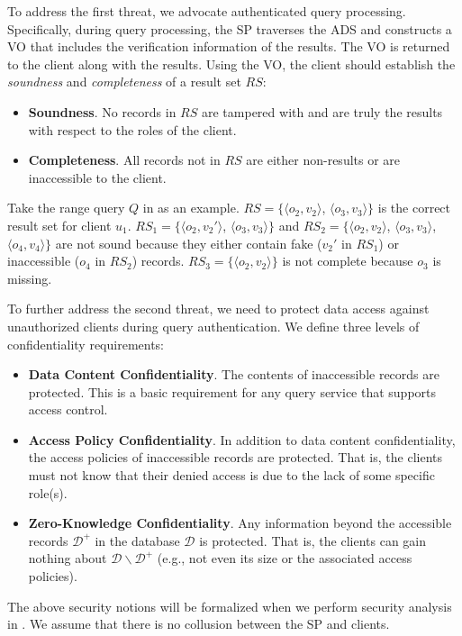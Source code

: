 To address the first threat, we advocate authenticated query processing. Specifically, during query processing, the SP traverses the ADS and constructs a VO that includes the verification information of the results. The VO is returned to the client along with the results. Using the VO, the client should establish the \emph{soundness} and \emph{completeness} of a result set $RS$:
\begin{itemize}
  \item \textbf{Soundness}. No records in $RS$ are tampered with and are truly the results with respect to the roles of the client.
  \item \textbf{Completeness}. All records not in $RS$ are either non-results or are inaccessible to the client.
\end{itemize}
Take the range query $Q$ in  as an example. $RS=\{\langle o_2, v_2\rangle$, $\langle o_3, v_3\rangle\}$ is the correct result set for client $u_1$. $RS_1 = \{\langle o_2, v_2'\rangle$, $\langle o_3, v_3\rangle\}$ and $RS_2 = \{\langle o_2, v_2\rangle$, $\langle o_3, v_3\rangle$, $\langle o_4, v_4\rangle\}$ are not sound because they either contain fake ($v_2'$ in $RS_1$) or inaccessible ($o_4$ in $RS_2$) records.  $RS_3 = \{\langle o_2, v_2\rangle\}$ is not complete because $o_3$ is missing.

To further address the second threat, we need to protect data access against unauthorized clients during query authentication. We define three levels of confidentiality requirements:
\begin{itemize}
  \item \textbf{Data Content Confidentiality}. The contents of inaccessible records are protected. This is a basic requirement for any query service that supports access control.
  \item \textbf{Access Policy Confidentiality}. In addition to data content confidentiality, the access policies of inaccessible records are protected. That is, the clients must not know that their denied access is due to the lack of some specific role(s). %
  \item \textbf{Zero-Knowledge Confidentiality}.
    Any information beyond the accessible records $\mathcal{D}^+$ in the database $\mathcal{D}$ is protected. That is, the clients can gain nothing about $\mathcal{D}\backslash\mathcal{D}^+$ (e.g., not even its size or the associated access policies).
\end{itemize}
The above security notions will be formalized  when we perform security analysis in . We assume that there is no collusion between the SP and clients.

